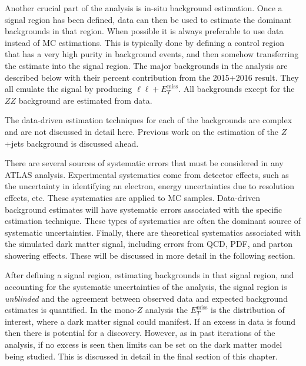 Another crucial part of the analysis is in-situ background estimation. Once a signal region has been defined, data can then be used to estimate the dominant backgrounds in that region. When possible it is always preferable to use data instead of MC estimations. This is typically done by defining a control region that has a very high purity in background events, and then somehow transferring the estimate into the signal region. The major backgrounds in the analysis are described below with their percent contribution from the 2015+2016 result. They all emulate the signal by producing $\ell\ell+E_T^\text{miss}$. All backgrounds except for the $ZZ$ background are estimated from data.

\noindent The data-driven estimation techniques for each of the backgrounds are complex and are not discussed in detail here. Previous work on the estimation of the $Z$+jets background is discussed ahead.

There are several sources of systematic errors that must be considered in any ATLAS analysis. Experimental systematics come from detector effects, such as the uncertainty in identifying an electron, energy uncertainties due to resolution effects, etc. These systematics are applied to MC samples. Data-driven background estimates will have systematic errors associated with the specific estimation technique. These types of systematics are often the dominant source of systematic uncertainties. Finally, there are theoretical systematics associated with the simulated dark matter signal, including errors from QCD, PDF, and parton showering effects. These will be discussed in more detail in the following section.

After defining a signal region, estimating backgrounds in that signal region, and accounting for the systematic uncertainties of the analysis, the signal region is \textit{unblinded} and the agreement between observed data and expected background estimates is quantified. In the mono-$Z$ analysis the $E_T^$ is the distribution of interest, where a dark matter signal could manifest. If an excess in data is found then there is potential for a discovery. However, as in past iterations of the analysis, if no excess is seen then limits can be set on the dark matter model being studied. This is discussed in detail in the final section of this chapter.


